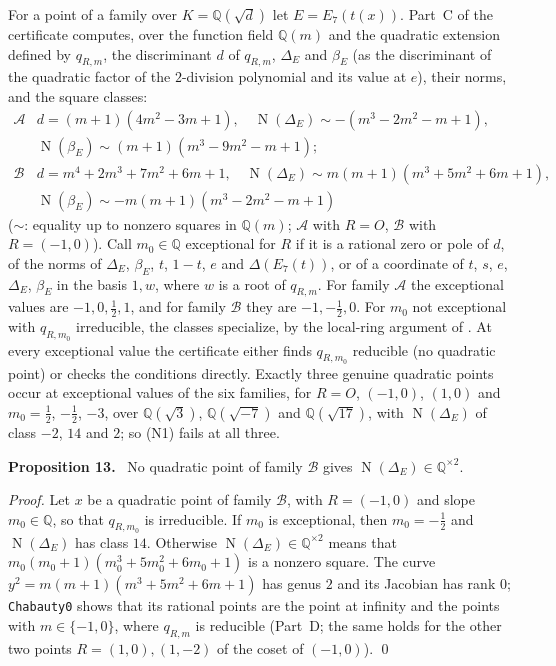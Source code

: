 \documentclass[11pt]{article}
\newenvironment{statement}[1]{\par\medskip\noindent\phantomsection\textbf{#1}\ }{\par\medskip}
\newcommand{\Q}{\mathbb Q}
\DeclareMathOperator{\Norm}{N}
\begin{document}
For a point of a family over \(K=\Q(\sqrt{d})\) let \(E=E_7(t(x))\). Part~C of the certificate computes, over the
function field \(\Q(m)\) and the quadratic extension defined by \(q_{R,m}\), the discriminant \(d\) of \(q_{R,m}\),
\(\Delta_E\) and \(\beta_E\) (as the discriminant of the quadratic factor of the \(2\)-division polynomial and its
value at \(e\)), their norms, and the square classes:
\[
\begin{array}{c|l}
\mathcal A & d=(m+1)(4m^2-3m+1),\quad \Norm(\Delta_E)\sim-(m^3-2m^2-m+1),\\
 & \Norm(\beta_E)\sim(m+1)(m^3-9m^2-m+1);\\[2pt]\hline
\mathcal B & d=m^4+2m^3+7m^2+6m+1,\quad \Norm(\Delta_E)\sim m(m+1)(m^3+5m^2+6m+1),\\
 & \Norm(\beta_E)\sim-m(m+1)(m^3-2m^2-m+1)
\end{array}
\]
(\(\sim\): equality up to nonzero squares in \(\Q(m)\); \(\mathcal A\) with \(R=O\), \(\mathcal B\) with
\(R=(-1,0)\)). Call \(m_0\in\Q\) exceptional for \(R\) if it is a rational zero or pole of \(d\), of the norms of
\(\Delta_E\), \(\beta_E\), \(t\), \(1-t\), \(e\) and \(\Delta(E_7(t))\), or of a coordinate of \(t\), \(s\), \(e\),
\(\Delta_E\), \(\beta_E\) in the basis \(1,w\), where \(w\) is a root of \(q_{R,m}\). For family \(\mathcal A\) the
exceptional values are \(-1,0,\frac12,1\), and for family \(\mathcal B\) they are \(-1,-\frac12,0\). For
\(m_0\) not exceptional with \(q_{R,m_0}\) irreducible, the classes specialize, by the local-ring argument of
\cite[Proposition~8]{P2210}. At every exceptional value the certificate either finds \(q_{R,m_0}\) reducible (no
quadratic point) or checks the conditions directly. Exactly three genuine quadratic points occur at exceptional
values of the six families, for \(R=O\), \((-1,0)\), \((1,0)\) and \(m_0=\frac12\), \(-\frac12\), \(-3\), over
\(\Q(\sqrt3)\), \(\Q(\sqrt{-7})\) and \(\Q(\sqrt{17})\), with \(\Norm(\Delta_E)\) of class \(-2\), \(14\) and \(2\);
so (N1) fails at all three.

\begin{statement}{Proposition 13.}\label{prop-B}
No quadratic point of family \(\mathcal B\) gives \(\Norm(\Delta_E)\in\Q^{\times2}\).
\end{statement}

\emph{Proof.} Let \(x\) be a quadratic point of family \(\mathcal B\), with \(R=(-1,0)\) and slope \(m_0\in\Q\), so
that \(q_{R,m_0}\) is irreducible. If \(m_0\) is exceptional, then \(m_0=-\frac12\) and \(\Norm(\Delta_E)\) has class
\(14\). Otherwise \(\Norm(\Delta_E)\in\Q^{\times2}\) means that \(m_0(m_0+1)(m_0^3+5m_0^2+6m_0+1)\) is a nonzero
square. The curve \(y^2=m(m+1)(m^3+5m^2+6m+1)\) has genus \(2\) and its Jacobian has rank \(0\); \texttt{Chabauty0}
shows that its rational points are the point at infinity and the points with \(m\in\{-1,0\}\), where \(q_{R,m}\) is
reducible (Part~D; the same holds for the other two points \(R=(1,0),(1,-2)\) of the coset of \((-1,0)\)). \qed
\end{document}
